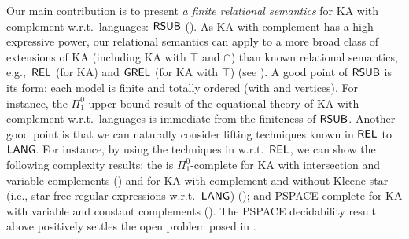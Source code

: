 Our main contribution is to present \emph{a finite relational semantics} for KA with complement w.r.t.\ languages:  $\mathsf{RSUB}$ ().
As KA with complement has a high expressive power,
our relational semantics can apply to a more broad class of extensions of KA (including KA with $\top$ and $\cap$) than known relational semantics, e.g.,\ $\mathsf{REL}$ (for KA) \cite[third page]{prattDynamicAlgebrasNature1980} and $\mathsf{GREL}$ (for KA with $\top$) \cite{zhangIncorrectnessLogicKleene2022,pousCompletenessTheoremsKleene2022} (see ).
A good point of $\mathsf{RSUB}$ is its form; each model is finite and totally ordered (with  and  vertices).
For instance, the $\Pi^{0}_{1}$ upper bound result of the equational theory of KA with complement w.r.t.\ languages is immediate from the finiteness of $\mathsf{RSUB}$.
Another good point is that we can naturally consider lifting techniques known in $\mathsf{REL}$ to $\mathsf{LANG}$.
For instance, by using the techniques in \cite{nakamuraExistentialCalculiRelations2023} w.r.t.\ $\mathsf{REL}$, we can show the following complexity results: the  is $\Pi^{0}_{1}$-complete for KA with intersection and variable complements () and for KA with complement and without Kleene-star (i.e., star-free regular expressions w.r.t.\ $\mathsf{LANG}$) (); and PSPACE-complete for KA with variable and constant complements ().
The PSPACE decidability result above positively settles the open problem posed in \cite[Sect.\ 7]{nakamuraWordstoLettersValuationsLanguage2023}.

